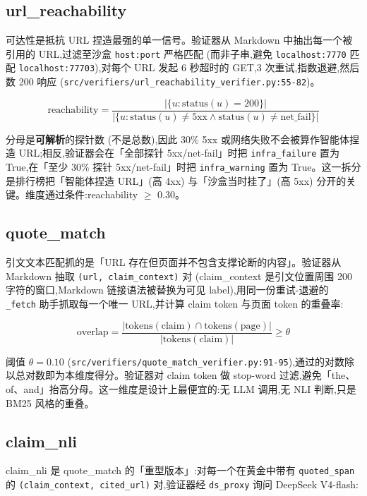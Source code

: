 \documentclass[UTF8,a4paper,12pt,oneside]{ctexart}
\begin{document}
\subsection{url\_reachability}

可达性是抵抗 URL 捏造最强的单一信号。验证器从 Markdown 中抽出每一个被引用的 URL,过滤至沙盒 \texttt{host:port} 严格匹配 (而非子串,避免 \texttt{localhost:7770} 匹配 \texttt{localhost:77703}),对每个 URL 发起 6 秒超时的 GET,3 次重试,指数退避,然后数 200 响应 (\texttt{src/verifiers/url\_reachability\_verifier.py:55-82})。

\[
\text{reachability} = \frac{\bigl|\{u : \text{status}(u) = 200\}\bigr|}{\bigl|\{u : \text{status}(u) \neq 5\text{xx} \land \text{status}(u) \neq \text{net\_fail}\}\bigr|}
\]

分母是\textbf{可解析}的探针数 (不是总数),因此 30\% 5xx 或网络失败不会被算作智能体捏造 URL;相反,验证器会在「全部探针 5xx/net-fail」时把 \texttt{infra\_failure} 置为 True,在「至少 30\% 探针 5xx/net-fail」时把 \texttt{infra\_warning} 置为 True。这一拆分是排行榜把「智能体捏造 URL」(高 4xx) 与「沙盒当时挂了」(高 5xx) 分开的关键。维度通过条件:reachability \(\geq\) 0.30。

\subsection{quote\_match}

引文文本匹配抓的是「URL 存在但页面并不包含支撑论断的内容」。验证器从 Markdown 抽取 \texttt{(url, claim\_context)} 对 (claim\_context 是引文位置周围 200 字符的窗口,Markdown 链接语法被替换为可见 label),用同一份重试-退避的 \texttt{\_fetch} 助手抓取每一个唯一 URL,并计算 claim token 与页面 token 的重叠率:

\[
\text{overlap} = \frac{|\text{tokens}(\text{claim}) \cap \text{tokens}(\text{page})|}{|\text{tokens}(\text{claim})|} \geq \theta
\]

阈值 \(\theta = 0.10\) (\texttt{src/verifiers/quote\_match\_verifier.py:91-95}),通过的对数除以总对数即为本维度得分。验证器对 claim token 做 stop-word 过滤,避免「the、of、and」抬高分母。这一维度是设计上最便宜的:无 LLM 调用,无 NLI 判断,只是 BM25 风格的重叠。

\subsection{claim\_nli}

claim\_nli 是 quote\_match 的「重型版本」:对每一个在黄金中带有 \texttt{quoted\_span} 的 \texttt{(claim\_context, cited\_url)} 对,验证器经 \texttt{ds\_proxy} 询问 DeepSeek V4-flash:
\end{document}
